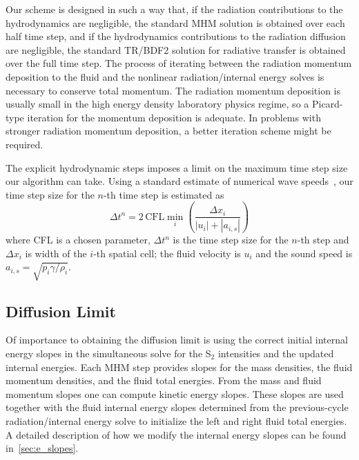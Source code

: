 \documentclass[preprint,12pt]{elsarticle}
\begin{document}
Our scheme is designed in such a way that, 
if the radiation contributions to the hydrodynamics are negligible, the standard MHM solution is obtained over each half time step, and if the hydrodynamics contributions to 
the radiation diffusion are negligible, the standard TR/BDF2 solution for radiative transfer is obtained over the full time step.  The process of iterating 
between the radiation momentum deposition to the fluid and the nonlinear radiation/internal energy solves is necessary to conserve total momentum.  
The radiation momentum deposition is usually small in the high energy density laboratory physics  regime, so a Picard-type iteration for the
momentum deposition is adequate.  In problems 
with stronger radiation momentum deposition, a better iteration scheme might be required. 

The explicit hydrodynamic steps imposes a limit on the maximum time step size our
algorithm can take.
Using a standard estimate of numerical wave speeds~\cite{toro}, our time step size for the $n$-th time
step is estimated as
\begin{equation}\label{eq:cfl}
    \Delta t^n = 2\,\text{CFL} \min_{i}\left(\frac{\Delta x_i}{|u_i| + |a_{i,s}|}\right)
\end{equation}
where CFL is a chosen parameter, $\Delta t^n$ is the time step size for the $n$-th step
and $\Delta x_i$ is width of the $i$-th spatial cell; the fluid velocity is $u_i$ and the
sound speed is $a_{i,s}=\sqrt{p_i \gamma/\rho_i}$.



\subsection{Diffusion Limit}
\label{sec:diffusion-limit}
Of importance to obtaining the diffusion limit is using the correct initial internal energy slopes in the simultaneous solve for the 
S$_2$ intensities and the updated internal energies.  Each MHM step provides slopes for the mass densities, the fluid momentum densities, 
and the fluid total energies.  From the mass and fluid momentum slopes one can compute kinetic energy slopes.  These slopes are used 
together with the fluid internal energy slopes determined from the previous-cycle radiation/internal energy solve to initialize the left and right 
fluid total energies. A detailed description of how we modify the internal energy slopes can be found in~\ref{sec:e_slopes}.
\end{document}
